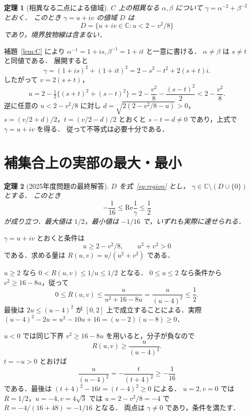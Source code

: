 \documentclass[a5paper,10pt,onecolumn]{jsarticle}
\makeatletter
\theoremstyle{mathnotetheorem}
\newtheorem{theorem}{定理}[section]
\renewcommand{\proofname}{証明}
\renewenvironment{proof}[1][\proofname]{%
  \par\pushQED{\qed}\normalfont\topsep4\p@\@plus2\p@\relax
  \trivlist\item[\hskip\labelsep\bfseries #1]\ignorespaces
}{\popQED\endtrivlist\@endpefalse}
\makeatother
\begin{document}
\begin{theorem}[相異なる二点による値域]\label{thm:range}
$C$ 上の相異なる $\alpha,\beta$ について
$\gamma=\alpha^{-2}+\beta^{-2}$ とおく．
このとき $\gamma=u+iv$ の値域 $D$ は
\begin{equation}\label{eq:region}
 D=\{u+iv\in\mathbb C:u<2-v^2/8\}
\end{equation}
であり，境界放物線は含まない．
\end{theorem}
\begin{proof}
補題~\ref{lem:C} により
$\alpha^{-1}=1+is,\beta^{-1}=1+it$ と一意に書ける．
$\alpha\ne\beta$ は $s\ne t$ と同値である．
展開すると
\[
 \gamma=(1+is)^2+(1+it)^2
 =2-s^2-t^2+2(s+t)i.
\]
したがって $v=2(s+t)$，
\[
 u=2-\tfrac12\{(s+t)^2+(s-t)^2\}
 =2-\frac{v^2}{8}-\frac{(s-t)^2}{2}
 <2-\frac{v^2}{8}.
\]
逆に任意の $u<2-v^2/8$ に対し
$d=\sqrt{2(2-v^2/8-u)}>0$，
$s=(v/2+d)/2$，$t=(v/2-d)/2$ とおくと $s-t=d\ne0$ であり，上式で $\gamma=u+iv$ を得る．
従って不等式は必要十分である．
\end{proof}

\section{補集合上の実部の最大・最小}
\begin{theorem}[2025年度問題の最終解答]\label{thm:extrema}
$D$ を式~\eqref{eq:region} とし，
$\gamma\in\mathbb C\setminus(D\cup\{0\})$ とする．
このとき
\[
 -\frac1{16}\le\mathrm{Re}\frac1\gamma\le\frac12
\]
が成り立つ．最大値は $1/2$，最小値は $-1/16$ で，いずれも実際に達せられる．
\end{theorem}
\begin{proof}
$\gamma=u+iv$ とおくと条件は
\[
 u\ge2-v^2/8,\qquad u^2+v^2>0
\]
である．求める量は $R(u,v)=u/(u^2+v^2)$ である．

$u\ge2$ なら $0<R(u,v)\le1/u\le1/2$ となる．
$0\le u\le2$ なら条件から $v^2\ge16-8u$，従って
\[
 0\le R(u,v)\le\frac{u}{u^2+16-8u}
 =\frac{u}{(u-4)^2}\le\frac12.
\]
最後は $2u\le(u-4)^2$ が $[0,2]$ 上で成立することによる．実際
$(u-4)^2-2u=u^2-10u+16=(u-2)(u-8)\ge0$．

$u<0$ では同じ下界 $v^2\ge16-8u$ を用いると，分子が負なので
\[
 R(u,v)\ge\frac{u}{(u-4)^2}.
\]
$t=-u>0$ とおけば
\[
 \frac{u}{(u-4)^2}=-\frac{t}{(t+4)^2}\ge-\frac1{16}
\]
である．最後は $(t+4)^2-16t=(t-4)^2\ge0$ による．
$u=2,v=0$ では $R=1/2$，$u=-4,v=4\sqrt3$ では
$u=2-v^2/8=-4$ で $R=-4/(16+48)=-1/16$ となる．
両点は $\gamma\ne0$ であり，条件を満たす．
\end{proof}
\end{document}
